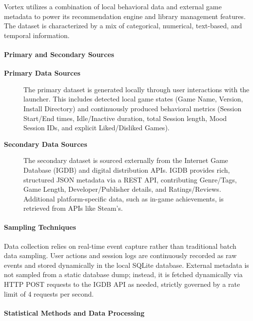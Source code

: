 Vortex utilizes a combination of local behavioral data and external game metadata to power its recommendation engine and library management features. The dataset is characterized by a mix of categorical, numerical, text-based, and temporal information.

\paragraph{Primary and Secondary Sources}

\begin{description}

\item[\textbf{Primary Data Sources}]
The primary dataset is generated locally through user interactions with the launcher. This includes detected local game states (Game Name, Version, Install Directory) and continuously produced behavioral metrics (Session Start/End times, Idle/Inactive duration, total Session length, Mood Session IDs, and explicit Liked/Disliked Games).

\item[\textbf{Secondary Data Sources}]
The secondary dataset is sourced externally from the Internet Game Database (IGDB) and digital distribution APIs. IGDB provides rich, structured JSON metadata via a REST API, contributing Genre/Tags, Game Length, Developer/Publisher details, and Ratings/Reviews. Additional platform-specific data, such as in-game achievements, is retrieved from APIs like Steam's.

\end{description}

\paragraph{Sampling Techniques}

Data collection relies on real-time event capture rather than traditional batch data sampling. User actions and session logs are continuously recorded as raw events and stored dynamically in the local SQLite database. External metadata is not sampled from a static database dump; instead, it is fetched dynamically via HTTP POST requests to the IGDB API as needed, strictly governed by a rate limit of 4 requests per second.

\paragraph{Statistical Methods and Data Processing}

